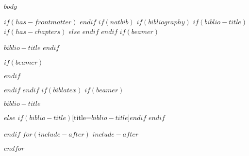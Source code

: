 \documentclass{nime-alternate} %
\begin{document}

\printccsdesc

$body$


$if(has-frontmatter)$
\backmatter
$endif$
$if(natbib)$
$if(bibliography)$
$if(biblio-title)$
$if(has-chapters)$
\renewcommand\bibname{$biblio-title$}
$else$
\renewcommand\refname{$biblio-title$}
$endif$
$endif$
$if(beamer)$
\begin{frame}[allowframebreaks]{$biblio-title$}
  \bibliographytrue
$endif$
  
$if(beamer)$
\end{frame}
$endif$

$endif$
$endif$
$if(biblatex)$
$if(beamer)$
\begin{frame}[allowframebreaks]{$biblio-title$}
  \bibliographytrue
  \printbibliography[heading=none]
\end{frame}
$else$
\printbibliography$if(biblio-title)$[title=$biblio-title$]$endif$
$endif$

$endif$
$for(include-after)$
$include-after$

$endfor$
\end{document}
